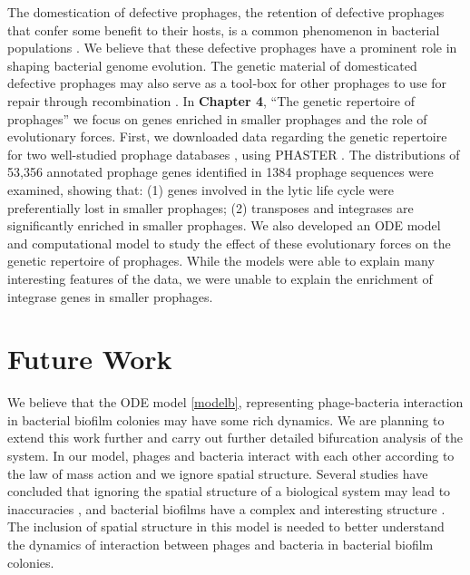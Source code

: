 The domestication of defective prophages, the retention of defective prophages that confer some benefit to their hosts, is a common phenomenon in bacterial populations \cite{bobay_pervasive_2014}. We believe that these defective prophages have a prominent role in shaping bacterial genome evolution. The genetic material of domesticated defective prophages may also serve as a tool‐box for other prophages to use for repair through recombination \cite{de_paepe_temperate_2014}. In \textbf{Chapter 4}, ``The genetic repertoire of prophages'' we focus on genes enriched in smaller prophages and the role of evolutionary forces. First, we downloaded data regarding the genetic repertoire for two well-studied prophage databases \cite{bobay_pervasive_2014, leplae_aclame:_2010}, using PHASTER \cite{arndt_phaster:_2016}. The distributions of 53,356 annotated prophage genes identified in 1384 prophage sequences were examined, showing that: (1) genes involved in the lytic life cycle were preferentially lost in smaller prophages; (2) transposes and integrases are significantly enriched in smaller prophages. We also developed an ODE model and computational model to study the effect of these evolutionary forces on the genetic repertoire of prophages.  While the models were able to explain many interesting features of the data, we were unable to explain the enrichment of integrase genes in smaller prophages. 

\section{Future Work}

We believe that the ODE model \ref{modelb}, representing phage-bacteria interaction in bacterial biofilm colonies may have some rich dynamics. We are planning to extend this work further and carry out further detailed bifurcation analysis of the system. In our model, phages and bacteria interact with each other according to the law of mass action and we ignore spatial structure. Several studies have concluded that ignoring the spatial structure of a biological system may lead to inaccuracies \cite{dieckmann_geometry_2000}, and bacterial biofilms have a complex and interesting structure \cite{flemming_biofilms:_2016}. The inclusion of spatial structure in this model is needed to better understand the dynamics of interaction between phages and bacteria in bacterial biofilm colonies.

